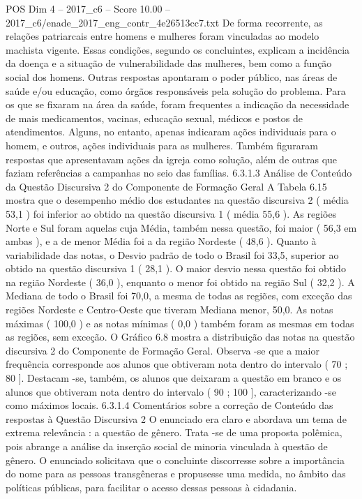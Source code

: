 \begin{textsample}{POS Dim 4 – 2017\_c6 – Score 10.00 – 2017\_c6/enade\_2017\_eng\_contr\_4e26513cc7.txt}
De forma recorrente, as relações patriarcais entre homens e mulheres foram vinculadas ao modelo machista vigente.
Essas condições, segundo os concluintes, explicam a incidência da doença e a situação de vulnerabilidade das mulheres, bem como a função social dos homens.
Outras respostas apontaram o poder público, nas áreas de saúde e/ou educação, como órgãos responsáveis pela solução do problema.
Para os que se fixaram na área da saúde, foram frequentes a indicação da necessidade de mais medicamentos, vacinas, educação sexual, médicos e postos de atendimentos.
Alguns, no entanto, apenas indicaram ações individuais para o homem, e outros, ações individuais para as mulheres.
Também figuraram respostas que apresentavam ações da igreja como solução, além de outras que faziam referências a campanhas no seio das famílias. 6.3.1.3 Análise de Conteúdo da Questão Discursiva 2 do Componente de Formação Geral A Tabela 6.15 mostra que o desempenho médio dos estudantes na questão discursiva 2 ( média 53,1 ) foi inferior ao obtido na questão discursiva 1 ( média 55,6 ).
As regiões Norte e Sul foram aquelas cuja Média, também nessa questão, foi maior ( 56,3 em ambas ), e a de menor Média foi a da região Nordeste ( 48,6 ).
Quanto à variabilidade das notas, o Desvio padrão de todo o Brasil foi 33,5, superior ao obtido na questão discursiva 1 ( 28,1 ).
O maior desvio nessa questão foi obtido na região Nordeste ( 36,0 ), enquanto o menor foi obtido na região Sul ( 32,2 ).
A Mediana de todo o Brasil foi 70,0, a mesma de todas as regiões, com exceção das regiões Nordeste e Centro-Oeste que tiveram Mediana menor, 50,0.
As notas máximas ( 100,0 ) e as notas mínimas ( 0,0 ) também foram as mesmas em todas as regiões, sem exceção.
O Gráfico 6.8 mostra a distribuição das notas na questão discursiva 2 do Componente de Formação Geral.
Observa -se que a maior frequência corresponde aos alunos que obtiveram nota dentro do intervalo ( 70 ; 80 ].
Destacam -se, também, os alunos que deixaram a questão em branco e os alunos que obtiveram nota dentro do intervalo ( 90 ; 100 ], caracterizando -se como máximos locais. 6.3.1.4 Comentários sobre a correção de Conteúdo das respostas à Questão Discursiva 2 O enunciado era claro e abordava um tema de extrema relevância : a questão de gênero.
Trata -se de uma proposta polêmica, pois abrange a análise da inserção social de minoria vinculada à questão de gênero.
O enunciado solicitava que o concluinte discorresse sobre a importância do nome para as pessoas transgêneras e propusesse uma medida, no âmbito das políticas públicas, para facilitar o acesso dessas pessoas à cidadania.

\end{textsample}
